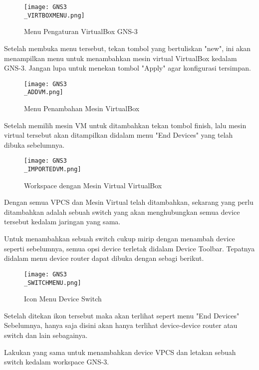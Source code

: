\documentclass[12pt, a4paper]{article}
\begin{document}
      \begin{figure}[h]
          \centering
          \texttt{[image: GNS3\\\_VIRTBOXMENU.png]}
          \caption{\small{Menu Pengaturan VirtualBox GNS-3}}
      \end{figure}


      Setelah membuka menu tersebut, tekan tombol yang bertuliskan "new", ini
      akan menampilkan menu untuk menambahkan mesin virtual VirtualBox kedalam
      GNS-3. Jangan lupa untuk menekan tombol "Apply" agar konfigurasi
      tersimpan.

      \begin{figure}[h]
          \centering
          \texttt{[image: GNS3\\\_ADDVM.png]}
          \caption{\small{Menu Penambahan Mesin VirtualBox}}
      \end{figure}

      Setelah memilih mesin VM untuk ditambahkan tekan tombol finish, lalu
      mesin virtual tersebut akan ditampilkan didalam menu "End Devices" yang
      telah dibuka sebelumnya.

      \begin{figure}[h]
          \centering
          \texttt{[image: GNS3\\\_IMPORTEDVM.png]}
          \caption{\small{Workspace dengan Mesin Virtual VirtualBox}}
      \end{figure}

      Dengan semua VPCS dan Mesin Virtual telah ditambahkan, sekarang yang
      perlu ditambahkan adalah sebuah switch yang akan menghubungkan semua device 
      tersebut kedalam jaringan yang sama.

      Untuk menambahkan sebuah switch cukup mirip dengan menambah device seperti
      sebelumnya, semua opsi device terletak didalam Device Toolbar. Tepatnya
      didalam menu device router dapat dibuka dengan sebagi berikut.

      \begin{figure}[h]
          \centering
          \texttt{[image: GNS3\\\_SWITCHMENU.png]}
          \caption{\small{Icon Menu Device Switch}}
      \end{figure}

      Setelah ditekan ikon tersebut maka akan terlihat sepert menu "End Devices"
      Sebelumnya, hanya saja disini akan hanya terlihat device-device router atau
      switch dan lain sebagainya.

      Lakukan yang sama untuk menambahkan device VPCS dan letakan sebuah switch
      kedalam workspace GNS-3.
 
\end{document}
